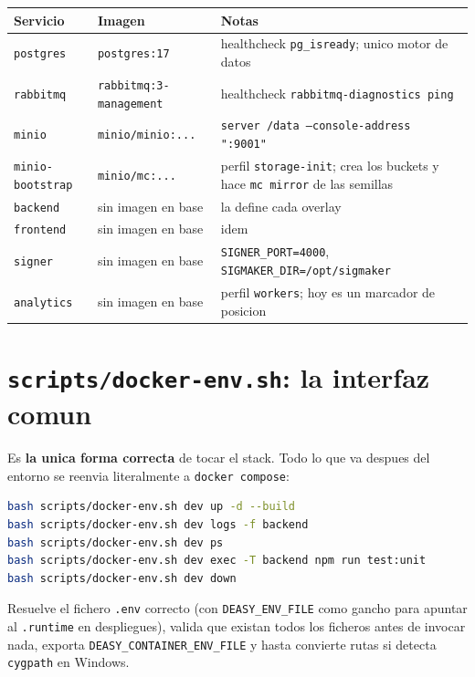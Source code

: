 \documentclass[11pt,a4paper,oneside]{report}
\newcommand{\rt}[1]{\texttt{#1}}
\begin{document}
\begin{center}
\footnotesize
\begin{tabularx}{\textwidth}{@{}P{2.9cm}P{4.4cm}L@{}}
\toprule
\textbf{Servicio} & \textbf{Imagen} & \textbf{Notas} \\
\midrule
\rt{postgres}        & \rt{postgres:17} & healthcheck \rt{pg\_isready}; unico motor de datos \\
\rt{rabbitmq}        & \rt{rabbitmq:3-management} & healthcheck \rt{rabbitmq-diagnostics ping} \\
\rt{minio}           & \rt{minio/minio:...} & \rt{server /data --console-address ":9001"} \\
\rt{minio-bootstrap} & \rt{minio/mc:...} & perfil \rt{storage-init}; crea los buckets y hace \rt{mc mirror} de las semillas \\
\rt{backend}         & sin imagen en base & la define cada overlay \\
\rt{frontend}        & sin imagen en base & idem \\
\rt{signer}          & sin imagen en base & \rt{SIGNER\_PORT=4000}, \rt{SIGMAKER\_DIR=/opt/sigmaker} \\
\rt{analytics}       & sin imagen en base & perfil \rt{workers}; hoy es un marcador de posicion \\
\bottomrule
\end{tabularx}
\end{center}

\section{\rt{scripts/docker-env.sh}: la interfaz comun}

Es \textbf{la unica forma correcta} de tocar el stack. Todo lo que va despues del entorno se
reenvia literalmente a \rt{docker compose}:

\begin{lstlisting}[language=bash]
bash scripts/docker-env.sh dev up -d --build
bash scripts/docker-env.sh dev logs -f backend
bash scripts/docker-env.sh dev ps
bash scripts/docker-env.sh dev exec -T backend npm run test:unit
bash scripts/docker-env.sh dev down
\end{lstlisting}

Resuelve el fichero \rt{.env} correcto (con \rt{DEASY\_ENV\_FILE} como gancho para apuntar al
\rt{.runtime} en despliegues), valida que existan todos los ficheros antes de invocar nada,
exporta \rt{DEASY\_CONTAINER\_ENV\_FILE} y hasta convierte rutas si detecta \rt{cygpath} en
Windows.
\end{document}
